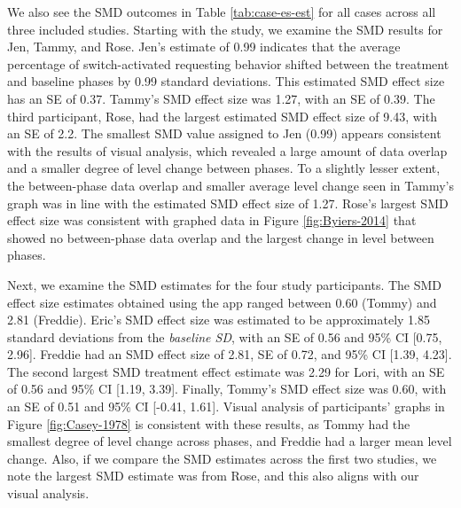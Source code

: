 \documentclass[
]{book}
\begin{document}
We also see the SMD outcomes in Table \ref{tab:case-es-est} for all cases across all three included studies. Starting with the \citet{Byiers2014} study, we examine the SMD results for Jen, Tammy, and Rose. Jen's estimate of 0.99 indicates that the average percentage of switch-activated requesting behavior shifted between the treatment and baseline phases by 0.99 standard deviations. This estimated SMD effect size has an SE of 0.37. Tammy's SMD effect size was 1.27, with an SE of 0.39. The third participant, Rose, had the largest estimated SMD effect size of 9.43, with an SE of 2.2. The smallest SMD value assigned to Jen (0.99) appears consistent with the results of visual analysis, which revealed a large amount of data overlap and a smaller degree of level change between phases. To a slightly lesser extent, the between-phase data overlap and smaller average level change seen in Tammy's graph was in line with the estimated SMD effect size of 1.27. Rose's largest SMD effect size was consistent with graphed data in Figure \ref{fig:Byiers-2014} that showed no between-phase data overlap and the largest change in level between phases.

Next, we examine the SMD estimates for the four \citet{Casey1978} study participants. The SMD effect size estimates obtained using the app ranged between 0.60 (Tommy) and 2.81 (Freddie). Eric's SMD effect size was estimated to be approximately 1.85 standard deviations from the \emph{baseline SD}, with an SE of 0.56 and 95\% CI {[}0.75, 2.96{]}. Freddie had an SMD effect size of 2.81, SE of 0.72, and 95\% CI {[}1.39, 4.23{]}. The second largest SMD treatment effect estimate was 2.29 for Lori, with an SE of 0.56 and 95\% CI {[}1.19, 3.39{]}. Finally, Tommy's SMD effect size was 0.60, with an SE of 0.51 and 95\% CI {[}-0.41, 1.61{]}. Visual analysis of participants' graphs in Figure \ref{fig:Casey-1978} is consistent with these results, as Tommy had the smallest degree of level change across phases, and Freddie had a larger mean level change. Also, if we compare the SMD estimates across the first two studies, we note the largest SMD estimate was from Rose, and this also aligns with our visual analysis.
\end{document}
